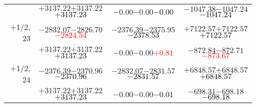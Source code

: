 \documentclass[compress]{beamer}
\begin{document}
\begin{frame}
{\begin{tabular}{r | c | c | c}
           & $+3137.22$\hspace{0.1 cm}$+3137.22$\hspace{0.1 cm}\textcolor{black}{$+3137.23$} & $-0.00$\hspace{0.1 cm}$-0.00$\hspace{0.1 cm}\textcolor{black}{$-0.00$} & $-1047.38$\hspace{0.1 cm}$-1047.24$\hspace{0.1 cm}\textcolor{black}{$-1047.24$} \\
$+$1/2, 23 & $-2832.07$\hspace{0.1 cm}$-2826.70$\hspace{0.1 cm}\textcolor{red}{$-2824.54$} & $-2376.39$\hspace{0.1 cm}$-2375.95$\hspace{0.1 cm}\textcolor{black}{$-2378.53$} & $+7122.57$\hspace{0.1 cm}$+7122.57$\hspace{0.1 cm}\textcolor{black}{$+7122.57$} \\
           & $+3137.22$\hspace{0.1 cm}$+3137.22$\hspace{0.1 cm}\textcolor{black}{$+3137.23$} & $-0.00$\hspace{0.1 cm}$-0.00$\hspace{0.1 cm}\textcolor{red}{$+0.81$} & $-872.84$\hspace{0.1 cm}$-872.71$\hspace{0.1 cm}\textcolor{red}{$-873.67$} \\
$+$1/2, 24 & $-2376.39$\hspace{0.1 cm}$-2370.96$\hspace{0.1 cm}\textcolor{black}{$-2370.96$} & $-2832.07$\hspace{0.1 cm}$-2831.57$\hspace{0.1 cm}\textcolor{black}{$-2831.57$} & $+6848.57$\hspace{0.1 cm}$+6848.57$\hspace{0.1 cm}\textcolor{black}{$+6848.57$} \\
           & $+3137.22$\hspace{0.1 cm}$+3137.22$\hspace{0.1 cm}\textcolor{black}{$+3137.23$} & $-0.00$\hspace{0.1 cm}$-0.00$\hspace{0.1 cm}\textcolor{black}{$-0.01$} & $-698.31$\hspace{0.1 cm}$-698.18$\hspace{0.1 cm}\textcolor{black}{$-698.18$} \\
\end{tabular}}
\end{frame}
\end{document}
